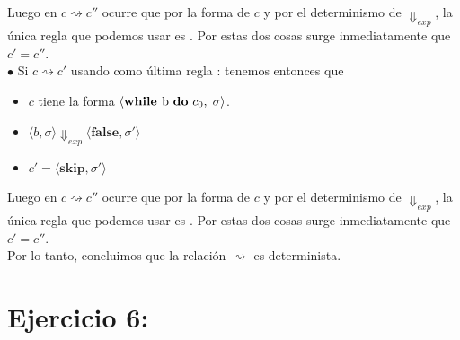 \documentclass[11pt, fleqn]{article}
\begin{document}
Luego en $ c \rightsquigarrow c'' $ ocurre que por la forma de $c$ y por el determinismo
de $\Downarrow_{exp}$, la única regla que podemos usar es . Por estas dos cosas
surge inmediatamente que $c' = c''$. \\


$\bullet$ Si $ c \rightsquigarrow c' $ usando como última regla : tenemos entonces que
\begin{itemize}
      \item $c$ tiene la forma $ \langle \textbf{while } \text{b \textbf{do} } c_0, \; \sigma \rangle$.
      \item $ \langle b, \sigma \rangle \Downarrow_{exp} \langle \textbf{false}, \sigma' \rangle$
      \item $c' = \langle \textbf{skip}, \sigma' \rangle$
\end{itemize}

Luego en $ c \rightsquigarrow c'' $ ocurre que por la forma de $c$ y por el determinismo
de $\Downarrow_{exp}$, la única regla que podemos usar es . Por estas dos cosas
surge inmediatamente que $c' = c''$. \\

Por lo tanto, concluimos que la relación $ \rightsquigarrow $ es determinista.


\section*{Ejercicio 6:}
\end{document}
